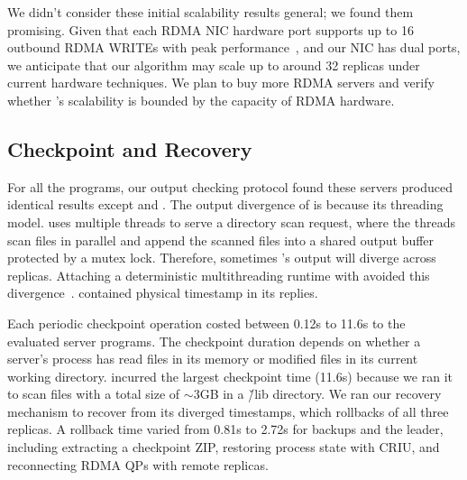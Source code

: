 We didn't consider these initial scalability results general; we found them 
promising. Given that each RDMA NIC hardware port supports up to 16 outbound 
RDMA WRITEs with peak performance~\cite{herd:sigcomm14}, and our NIC has dual 
ports, we anticipate that our algorithm may scale up to around 32 replicas 
under current hardware techniques. We plan to buy more RDMA servers and verify 
whether \xxx's scalability is bounded by the capacity of RDMA hardware.






\subsection{Checkpoint and Recovery} \label{sec:robust}

For all the \nprog programs, our output checking protocol found these servers 
produced identical results except \clamav and \mediatomb. The output divergence 
of \clamav is because its threading model. \clamav uses multiple threads to 
serve a directory scan request, where the threads scan files in parallel and 
append the scanned files into a shared output buffer protected by a mutex lock. 
Therefore, sometimes \clamav's output will diverge across replicas. Attaching a 
deterministic multithreading runtime with \clamav avoided this 
divergence~\cite{crane:sosp15}. \mediatomb contained physical timestamp in its 
replies.

Each \xxx periodic checkpoint operation costed between 0.12s to 11.6s to the 
evaluated server programs. The checkpoint duration depends on whether a 
server's process has read files in its memory or modified files in its current 
working directory. \clamav incurred the largest checkpoint time (11.6s) because 
we ran it to scan files with a total size of $\sim$3GB in a \v{/lib} directory. 
We ran our recovery mechanism to recover \clamav from its diverged 
timestamps, which rollbacks of all three replicas. A \clamav rollback time 
varied from 0.81s to 2.72s for backups and the leader, including extracting a 
checkpoint ZIP, restoring process state with CRIU, and reconnecting RDMA QPs 
with remote replicas.

